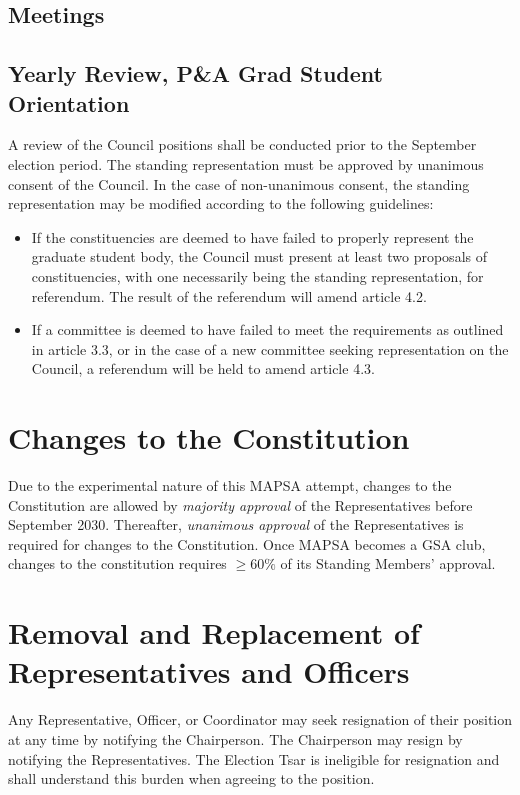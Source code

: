 \documentclass[8pt]{article}
\begin{document}
	\subsection{Meetings}
	
	\subsection{Yearly Review, P\&A Grad Student Orientation}
	A review of the Council positions shall be conducted prior to the September election period. The standing representation must be approved by unanimous consent of the Council. In the case of non-unanimous consent, the standing representation may be modified according to the following guidelines:
	\begin{itemize}
		\item If the constituencies are deemed to have failed to properly represent the graduate student body, the Council must present at least two proposals of constituencies, with one necessarily being the standing representation, for referendum. The result of the referendum will amend article 4.2.
		\item If a committee is deemed to have failed to meet the requirements as outlined in article 3.3, or in the case of a new committee seeking representation on the Council, a referendum will be held to amend article 4.3.
	\end{itemize}
	\section{Changes to the Constitution}
	Due to the experimental nature of this MAPSA attempt, changes to the Constitution are allowed by \textit{majority approval} of the Representatives before September 2030. Thereafter, \textit{unanimous approval} of the Representatives is required for changes to the Constitution. Once MAPSA becomes a GSA club, changes to the constitution requires $\geq 60\%$ of its Standing Members' approval.
	
	\section{Removal and Replacement of Representatives and Officers}\label{sec:remove}
	Any Representative, Officer, or Coordinator may seek resignation of their position at any time by notifying the Chairperson. The Chairperson may resign by notifying the Representatives. The Election Tsar is ineligible for resignation and shall understand this burden when agreeing to the position.
\end{document}
